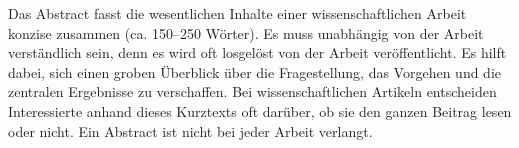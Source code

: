 Das Abstract fasst die wesentlichen Inhalte einer wissenschaftlichen Arbeit konzise zusammen (ca. 150–250 Wörter). 
Es muss unabhängig von der Arbeit verständlich sein, denn es wird oft losgelöst von der Arbeit veröffentlicht. Es hilft dabei, sich einen groben Überblick über die Fragestellung, das Vorgehen und die zentralen Ergebnisse zu verschaffen. Bei wissenschaftlichen Artikeln entscheiden Interessierte anhand dieses Kurztexts oft darüber, ob sie den ganzen Beitrag lesen oder nicht. Ein
Abstract ist nicht bei jeder Arbeit verlangt.
